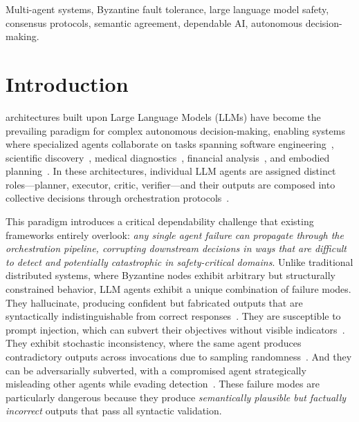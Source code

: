\documentclass[journal,10pt]{IEEEtran}
\begin{document}
\begin{IEEEkeywords}
Multi-agent systems, Byzantine fault tolerance, large language model safety, consensus protocols, semantic agreement, dependable AI, autonomous decision-making.
\end{IEEEkeywords}

\section{Introduction}
 architectures built upon Large Language Models (LLMs) have become the prevailing paradigm for complex autonomous decision-making, enabling systems where specialized agents collaborate on tasks spanning software engineering~\cite{hong2024metagpt}, scientific discovery~\cite{boiko2023autonomous}, medical diagnostics~\cite{tang2024medagents}, financial analysis~\cite{li2024finagent}, and embodied planning~\cite{wang2024voyager}. In these architectures, individual LLM agents are assigned distinct roles---planner, executor, critic, verifier---and their outputs are composed into collective decisions through orchestration protocols~\cite{wu2023autogen, park2023generative}.

This paradigm introduces a critical dependability challenge that existing frameworks entirely overlook: \emph{any single agent failure can propagate through the orchestration pipeline, corrupting downstream decisions in ways that are difficult to detect and potentially catastrophic in safety-critical domains}. Unlike traditional distributed systems, where Byzantine nodes exhibit arbitrary but structurally constrained behavior, LLM agents exhibit a unique combination of failure modes. They hallucinate, producing confident but fabricated outputs that are syntactically indistinguishable from correct responses~\cite{huang2023survey}. They are susceptible to prompt injection, which can subvert their objectives without visible indicators~\cite{liu2024promptinjection}. They exhibit stochastic inconsistency, where the same agent produces contradictory outputs across invocations due to sampling randomness~\cite{wang2023selfconsistency}. And they can be adversarially subverted, with a compromised agent strategically misleading other agents while evading detection~\cite{zhang2024injecagent}. These failure modes are particularly dangerous because they produce \emph{semantically plausible but factually incorrect} outputs that pass all syntactic validation.
\end{document}
